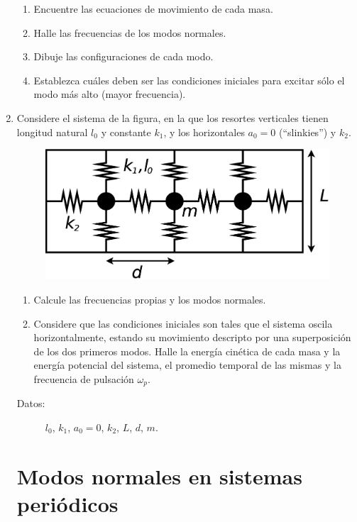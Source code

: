 \documentclass[11pt,spanish,a4paper]{article}
\begin{document}
\begin{enumerate}
\begin{enumerate}
\item Encuentre las ecuaciones de movimiento de cada masa. 
\item Halle las frecuencias de los modos normales. 
\item Dibuje las configuraciones de cada modo. 
\item Establezca cuáles deben ser las condiciones iniciales para excitar
sólo el modo más alto (mayor frecuencia).
\end{enumerate}


\item Considere el sistema de la figura, en la que los resortes verticales
tienen longitud natural $l_{0}$ y constante $k_{1}$, y los horizontales
$a_{0}=0$ (``slinkies'') y $k_{2}$.
\begin{figure}[H]
\centering{}\includegraphics[clip,scale=0.25]{ej1-10}
\end{figure}
\begin{enumerate}
\item Calcule las frecuencias propias y los modos normales. 
\item Considere que las condiciones iniciales son tales que el sistema oscila
horizontalmente, estando su movimiento descripto por una superposición
de los dos primeros modos. Halle la energía cinética de cada masa
y la energía potencial del sistema, el promedio temporal de las mismas
y la frecuencia de pulsación $\omega_{p}$. \end{enumerate}
\begin{description}
\item [{Datos:}] $l_{0}$, $k_{1}$, $a_{0}=0$, $k_{2}$, $L$, $d$,
$m$.
\end{description}


\section*{Modos normales en sistemas periódicos}



\end{enumerate}
\end{document}
